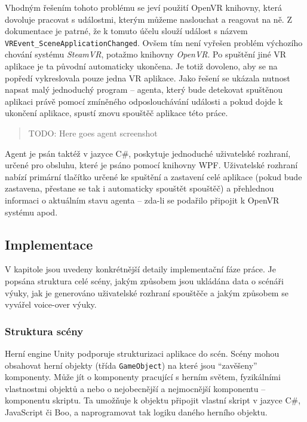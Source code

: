 Vhodným řešením tohoto problému se jeví použití OpenVR knihovny, která
dovoluje pracovat s událostmi, kterým můžeme naslouchat a reagovat na
ně. Z dokumentace je patrné, že k tomuto účelu slouží událost s názvem
\texttt{VREvent\_SceneApplicationChanged}. Ovšem tím není vyřešen
problém výchozího chování systému \emph{SteamVR}, potažmo knihovny
\emph{OpenVR}. Po spuštění jiné VR aplikace je ta původní automaticky
ukončena. Je totiž dovoleno, aby se na popředí vykreslovala pouze jedna
VR aplikace. Jako řešení se ukázala nutnost napsat malý jednoduchý
program -- agenta, který bude detekovat spuštěnou aplikaci právě pomocí
zmíněného odposlouchávání události a pokud dojde k ukončení aplikace,
spustí znovu spouštěč aplikace této práce.

\begin{quote}
TODO: Here goes agent screenshot
\end{quote}

Agent je psán taktéž v jazyce C\#, poskytuje jednoduché uživatelské
rozhraní, určené pro obsluhu, které je psáno pomocí knihovny WPF.
Uživatelské rozhraní nabízí primární tlačítko určené ke spuštění a
zastavení celé aplikace (pokud bude zastavena, přestane se tak i
automaticky spouštět spouštěč) a přehlednou informaci o aktuálním stavu
agenta -- zda-li se podařilo připojit k OpenVR systému apod.

\subsection{Implementace}\label{implementace}

V kapitole jsou uvedeny konkrétnější detaily implementační fáze práce.
Je popsána struktura celé scény, jakým způsobem jsou ukládána data o
scénáři výuky, jak je generováno uživatelské rozhraní spouštěče a jakým
způsobem se vyvářel voice-over výuky.

\subsubsection{Struktura scény}\label{struktura-scuxe9ny}

Herní engine Unity podporuje strukturizaci aplikace do scén. Scény mohou
obsahovat herní objekty (třída \texttt{GameObject}) na které jsou
``zavěšeny'' komponenty. Může jít o komponenty pracující s herním
světem, fyzikálními vlastnostmi objektů a nebo o nejobecnější a
nejmocnější komponentu -- komponentu skriptu. Ta umožňuje k objektu
připojit vlastní skript v jazyce C\#, JavaScript či Boo, a naprogramovat
tak logiku daného herního objektu.

